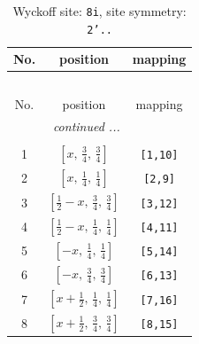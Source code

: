\documentclass[fleqn,8pt]{jsarticle}
\begin{document}
\begin{longtable}{ccc}
\caption{Wyckoff site: {\tt 8i}, site symmetry: {\tt 2'..}}
 \\
 \hline \hline
No. & position & mapping \\ \hline \endfirsthead

\multicolumn{2}{l}{\tablename\ \thetable{}} \\
 \hline \hline
No. & position & mapping \\ \hline \endhead

 \hline \hline
\multicolumn{2}{r}{\footnotesize\it continued ...} \\ \endfoot

 \hline \hline
\multicolumn{2}{r}{} \\ \endlastfoot

1 & $\left[ x,\, \frac{3}{4},\, \frac{3}{4} \right]$ & {\tt [1,10]} \\ \hline
2 & $\left[ x,\, \frac{1}{4},\, \frac{1}{4} \right]$ & {\tt [2,9]} \\ \hline
3 & $\left[ \frac{1}{2} - x,\, \frac{3}{4},\, \frac{3}{4} \right]$ & {\tt [3,12]} \\ \hline
4 & $\left[ \frac{1}{2} - x,\, \frac{1}{4},\, \frac{1}{4} \right]$ & {\tt [4,11]} \\ \hline
5 & $\left[ - x,\, \frac{1}{4},\, \frac{1}{4} \right]$ & {\tt [5,14]} \\ \hline
6 & $\left[ - x,\, \frac{3}{4},\, \frac{3}{4} \right]$ & {\tt [6,13]} \\ \hline
7 & $\left[ x + \frac{1}{2},\, \frac{1}{4},\, \frac{1}{4} \right]$ & {\tt [7,16]} \\ \hline
8 & $\left[ x + \frac{1}{2},\, \frac{3}{4},\, \frac{3}{4} \right]$ & {\tt [8,15]} \\
\end{longtable}
\renewcommand{\arraystretch}{1.2}
\end{document}
